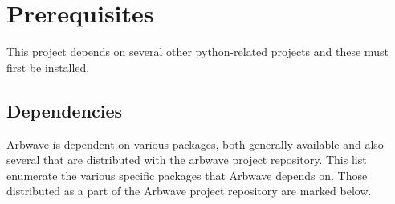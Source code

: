
\section{Prerequisites}

This project depends on several other python-related projects and these must
first be installed.

\subsection{Dependencies}
Arbwave is dependent on various packages, both generally available and also
several that are distributed with the arbwave project repository.  This list
enumerate the various specific packages that Arbwave depends on.  Those
distributed as a part of the Arbwave project repository are marked below.

